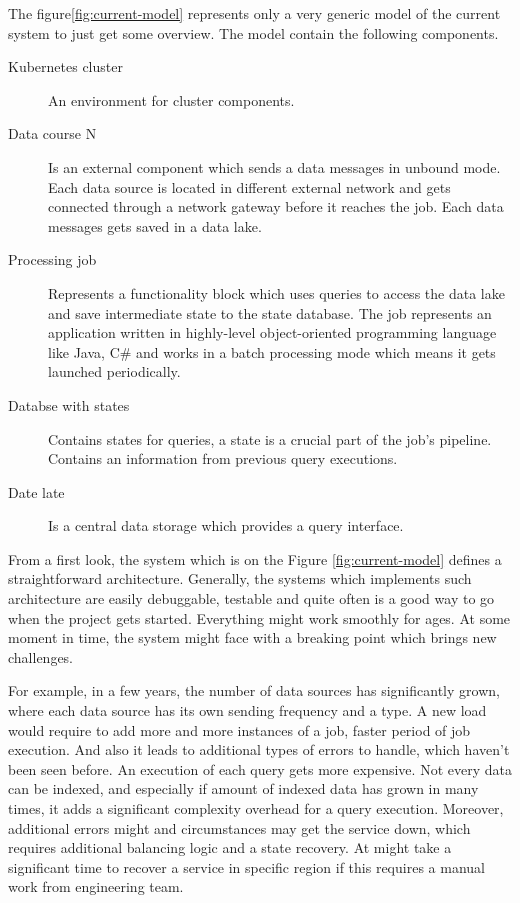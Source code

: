The figure\ref{fig:current-model} represents only a very generic model of the current
system to just get some overview.
The model contain the following components.

\begin{description}
    \item[Kubernetes cluster] An environment for cluster components.
    \item[Data course N] Is an external component which sends a data messages in unbound mode.
    Each data source is located in different external network and gets connected through
    a network gateway before it reaches the job.
    Each data messages gets saved in a data lake.
    \item[Processing job] Represents a functionality block which uses queries to access the
    data lake and save intermediate state to the state database.
    The job represents an application written in highly-level object-oriented programming language like Java, C\#
    and works in a batch processing mode which means it gets launched periodically.
    \item[Databse with states] Contains states for queries, a state is a crucial part of the job's pipeline.
    Contains an information from previous query executions.
    \item[Date late] Is a central data storage which provides a query interface.
\end{description}

From a first look, the system which is on the Figure \ref{fig:current-model} defines a straightforward
architecture.
Generally, the systems which implements such architecture are easily debuggable,
testable and quite often is a good way to go when the project gets started.
Everything might work smoothly for ages.
At some moment in time, the system might face with a breaking point which brings new challenges.

For example, in a few years, the number of data sources has significantly grown, where each
data source has its own sending frequency and a type.
A new load would require to add more and more instances of a job, faster period of job execution.
And also it leads to additional types of errors to handle, which haven't been seen before.
An execution of each query gets more expensive.
Not every data can be indexed, and especially if amount of indexed data has grown in many times, it adds
a significant complexity overhead for a query execution.
Moreover, additional errors might and circumstances may get the service down, which requires
additional balancing logic and a state recovery.
At might take a significant time to recover a service in specific region if this requires a manual work
from engineering team.

